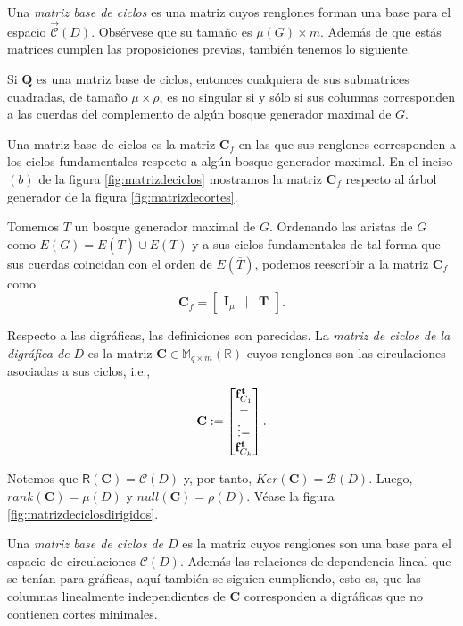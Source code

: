Una \textit{matriz base de ciclos} es una matriz cuyos renglones forman una base para el espacio $\overrightarrow{\mathcal{C}}(D)$. Obsérvese que su tamaño es $\mu(G) \times m$. Además de que estás matrices cumplen las proposiciones previas, también tenemos lo siguiente.

\begin{teo} \label{teo:submatricesmatridecortes}
Si $\mathbf{Q}$ es una matriz base de ciclos, entonces cualquiera de sus submatrices cuadradas, de tamaño $\mu \times \rho$, es no singular si y sólo si sus columnas corresponden a las cuerdas del complemento de algún bosque generador maximal de $G$.
\end{teo}

Una matriz base de ciclos es la matriz $\mathbf{C}_{f}$ en las que sus renglones corresponden a los ciclos fundamentales respecto a algún bosque generador maximal. En el inciso $(b)$ de la figura \ref{fig:matrizdeciclos} mostramos la matriz $\mathbf{C}_{f}$ respecto al árbol generador de la figura \ref{fig:matrizdecortes}.

Tomemos $T$ un bosque generador maximal de $G$. Ordenando las aristas de $G$ como $E(G) = E(\overline{T}) \cup E(T)$ y a sus ciclos fundamentales de tal forma que sus cuerdas coincidan con el orden de $E(\overline{T})$, podemos reescribir a la matriz $\mathbf{C}_{f}$ como
$$
\mathbf{C}_{f} = \begin{bmatrix}
\mathbf{I}_{\mu} & | & \mathbf{T}
\end{bmatrix}.
$$

Respecto a las digráficas, las definiciones son parecidas. La \textit{matriz de ciclos de la digráfica de $D$} es la matriz $\mathbf{C} \in \mathbb{M}_{q\times m}(\mathbb{R})$ cuyos renglones son las circulaciones asociadas a sus ciclos, i.e., $$ 
\mathbf{C}:= \begin{bmatrix} 
\mathbf{f}_{C_{1}}^{\mathbf{t}} \\
\-- \\
\vdots
\-- \\
\mathbf{f}_{C_{k}}^{\mathbf{t}}
\end{bmatrix}.
$$

Notemos que  $\mathsf{R}(\mathbf{C}) =\mathcal{C}(D)$ y, por tanto, $Ker(\mathbf{C}) = \mathcal{B}(D)$. Luego, $rank(\mathbf{C}) = \mu(D)$ y $null(\mathbf{C}) = \rho(D)$. Véase la figura \ref{fig:matrizdeciclosdirigidos}.

Una \textit{matriz base de ciclos de $D$} es la matriz cuyos renglones son una base para el espacio de circulaciones $\mathcal{C}(D)$. Además las relaciones de dependencia lineal que se tenían para gráficas, aquí también se siguien cumpliendo, esto es, que las columnas linealmente independientes de $\mathbf{C}$ corresponden a digráficas que no contienen cortes minimales.

